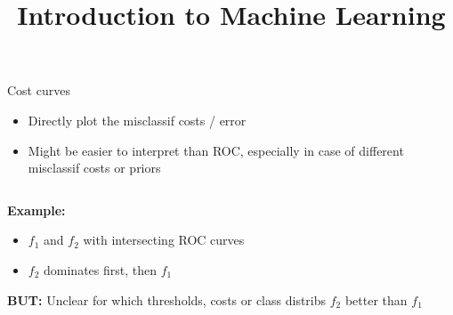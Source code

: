 \documentclass[11pt,compress,t,notes=noshow, xcolor=table]{beamer}
\title{Introduction to Machine Learning}
\institute{\href{https://compstat-lmu.github.io/lecture_i2ml/}{compstat-lmu.github.io/lecture\_i2ml}}
\date{}
\begin{document}
\sloppy

\begin{vbframe}{Cost curves}

\begin{itemize}
  \item Directly plot the misclassif costs / error
  \item Might be easier to interpret than ROC, especially in case of
      different misclassif costs or priors
\end{itemize}

\lz


\begin{columns}%
\begin{column}{0.6\textwidth}
  \small
  \raggedright
  \textbf{Example:} %
  \begin{itemize}
  \item $f_1$ and $f_2$ with intersecting ROC curves
  \item $f_2$ dominates first, then $f_1$
  \end{itemize}

\lz

  \textbf{BUT:} Unclear for which thresholds, costs or class distribs $f_2$ better than $f_1$


\end{column}
\end{columns}
\end{vbframe}
\end{document}
